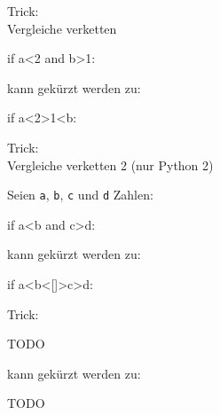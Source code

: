 \documentclass[xcolor=dvipsnames, aspectratio=43, 14pt]{beamer}
\begin{document}
\begin{frame}[fragile]{Trick:\\ Vergleiche verketten}
	\begin{python3code}
	if a<2 and b>1:
	\end{python3code}
	
	\vfill
	
	kann gekürzt werden zu:
	
	\vfill
	
	\begin{python3code}
	if a<2>1<b:
	\end{python3code}
\end{frame}

\begin{frame}[fragile]{Trick:\\ Vergleiche verketten 2}
	(nur Python 2)
	
	\vfill
	
	Seien \texttt{a}, \texttt{b}, \texttt{c} und \texttt{d} Zahlen:
	
	\vfill
	
	\begin{python3code}
	if a<b and c>d:
	\end{python3code}
	
	\vfill
	
	kann gekürzt werden zu:
	
	\vfill
	
	\begin{python3code}
	if a<b<[]>c>d:
	\end{python3code}
\end{frame}


\begin{frame}[fragile]{Trick: }
	\begin{python3code}
	TODO
	\end{python3code}
	
	\vfill
	
	kann gekürzt werden zu:
	
	\vfill
	
	\begin{python3code}
	TODO
	\end{python3code}
\end{frame}
\end{document}
